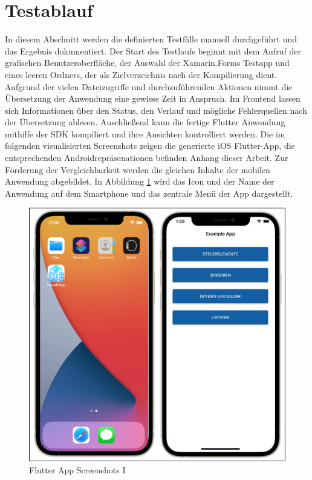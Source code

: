 \section{Testablauf}
In diesem Abschnitt werden die definierten Testfälle manuell durchgeführt und das Ergebnis dokumentiert. 
Der Start  des Testlaufs beginnt mit dem Aufruf der grafischen Benutzeroberfläche,   der Auswahl der Xamarin.Forms Testapp und eines leeren Ordners, der als Zielverzeichnis nach der Kompilierung dient. 
Aufgrund der vielen Dateizugriffe und durchzuführenden Aktionen nimmt die Übersetzung der Anwendung eine gewisse Zeit in Anspruch. Im Frontend lassen sich Informationen über den Status, den Verlauf und mögliche Fehlerquellen nach der Übersetzung ablesen.  Anschließend kann die fertige Flutter Anwendung mithilfe der SDK kompiliert und ihre Ansichten kontrolliert werden.  Die im folgenden visualisierten Screenshots zeigen die generierte iOS Flutter-App,  die entsprechenden Androidrepräsenationen befinden Anhang dieser Arbeit.  Zur Förderung der Vergleichbarkeit werden die gleichen Inhalte der mobilen Anwendung abgebildet.  In Abbildung \ref{fig:FlutterAppI} wird das Icon und der Name der Anwendung auf dem Smartphone und das zentrale Menü der App dargestellt.
\newpage
\begin{figure}[!ht]
 \includegraphics[width=\textwidth,keepaspectratio]{Images/Screenshot/AppIconAndMenu.png}
 \caption{Flutter App Screenshots I}
 \label{fig:FlutterAppI}
\end{figure}

